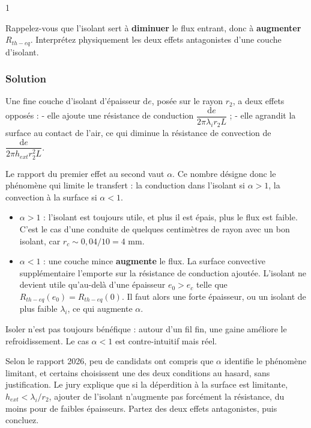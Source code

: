\documentclass[11pt,a4paper]{article}
\providecommand{\tightlist}{\setlength{\itemsep}{0pt}\setlength{\parskip}{0pt}}
\begin{document}
\begin{indication}{1}

Rappelez-vous que l'isolant sert à \textbf{diminuer} le flux entrant, donc à \textbf{augmenter} \(R_{th-eq}\). Interprétez physiquement les deux effets antagonistes d'une couche d'isolant.

\end{indication}

\hypertarget{solution-20}{%
\subsubsection{Solution}\label{solution-20}}

Une fine couche d'isolant d'épaisseur \(\mathrm{d}e\), posée sur le rayon \(r_2\), a deux effets opposés :
- elle ajoute une résistance de conduction \(\dfrac{\mathrm{d}e}{2\pi\lambda_i r_2L}\) ;
- elle agrandit la surface au contact de l'air, ce qui diminue la résistance de convection de \(\dfrac{\mathrm{d}e}{2\pi h_{ext}r_2^2L}\).

Le rapport du premier effet au second vaut \(\alpha\). Ce nombre désigne donc le phénomène qui limite le transfert : la conduction dans l'isolant si \(\alpha>1\), la convection à la surface si \(\alpha<1\).

\begin{itemize}
\tightlist
\item
  \textbf{\(\alpha>1\)} : l'isolant est toujours utile, et plus il est épais, plus le flux est faible. C'est le cas d'une conduite de quelques centimètres de rayon avec un bon isolant, car \(r_c\sim0{,}04/10=4\) mm.
\item
  \textbf{\(\alpha<1\)} : une couche mince \textbf{augmente} le flux. La surface convective supplémentaire l'emporte sur la résistance de conduction ajoutée. L'isolant ne devient utile qu'au-delà d'une épaisseur \(e_0>e_c\) telle que \(R_{th-eq}(e_0)=R_{th-eq}(0)\). Il faut alors une forte épaisseur, ou un isolant de plus faible \(\lambda_i\), ce qui augmente \(\alpha\).
\end{itemize}

\begin{piege}

Isoler n'est pas toujours bénéfique : autour d'un fil fin, une gaine améliore le refroidissement. Le cas \(\alpha<1\) est contre-intuitif mais réel.

\end{piege}

\begin{jury}

Selon le rapport 2026, peu de candidats ont compris que \(\alpha\) identifie le phénomène limitant, et certains choisissent une des deux conditions au hasard, sans justification. Le jury explique que si la déperdition à la surface est limitante, \(h_{ext}<\lambda_i/r_2\), ajouter de l'isolant n'augmente pas forcément la résistance, du moins pour de faibles épaisseurs. Partez des deux effets antagonistes, puis concluez.

\end{jury}
\end{document}
